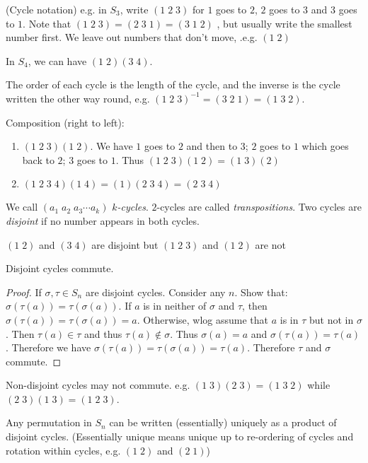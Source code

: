 \documentclass[a4pape]{article}
\begin{document}
\begin{notation}
  (Cycle notation) e.g. in $S_3$, write $(1\;2\;3)$ for $1$ goes to $2$, $2$ goes to $3$ and $3$ goes to $1$. Note that $(1\; 2\; 3) = (2\; 3\; 1) = (3\; 1\; 2)$ , but usually write the smallest number first. We leave out numbers that don't move, .e.g. $(1\; 2)$

  In $S_4$, we can have $(1\; 2)(3\; 4)$.
\end{notation}
\note The order of each cycle is the length of the cycle, and the inverse is the cycle written the other way round, e.g. $(1\; 2\; 3)^{-1} = (3\; 2\; 1) = (1\; 3\; 2)$.

\begin{eg}
  Composition (right to left):
  \begin{enumerate}
  \item $(1\; 2\; 3)(1\; 2)$. We have $1$ goes to $2$ and then to $3$; $2$ goes to $1$ which goes back to $2$; $3$ goes to $1$. Thus $(1\; 2\; 3)(1\; 2) = (1\;3)(2)$
  \item $(1\; 2\; 3\; 4)(1\; 4) = (1)(2\; 3\; 4) = (2\; 3\; 4)$
\end{enumerate}
\end{eg}
\begin{defi}
  We call $(a_1\; a_2\; a_3\cdots a_k)$ \emph{$k$-cycles}. $2$-cycles are called \emph{transpositions}. Two cycles are \emph{disjoint} if no number appears in both cycles.
\end{defi}
\begin{eg}
  $(1\; 2)$ and $(3\; 4)$ are disjoint but $(1\; 2\; 3)$ and $(1\; 2)$ are not
\end{eg}
\begin{lemma}
  Disjoint cycles commute.
\end{lemma}
\begin{proof}
  If $\sigma, \tau\in S_n$ are disjoint cycles. Consider any $n$. Show that: $\sigma(\tau(a)) = \tau(\sigma(a))$. If $a$ is in neither of $\sigma$ and $\tau$, then $\sigma(\tau(a)) = \tau(\sigma(a)) = a$. Otherwise, wlog assume that $a$ is in $\tau$ but not in $\sigma$. Then $\tau(a)\in \tau$ and thus $\tau(a)\not\in \sigma$. Thus $\sigma(a) = a$ and $\sigma(\tau(a)) = \tau(a)$. Therefore we have $\sigma(\tau(a)) = \tau(\sigma(a)) = \tau(a)$. Therefore $\tau$ and $\sigma$ commute.
\end{proof}
\note Non-disjoint cycles may not commute. e.g. $(1\; 3)(2\; 3) = (1\; 3\; 2)$ while $(2\; 3)(1\; 3) = (1\; 2\; 3)$.

\begin{thm}
  Any permutation in $S_n$ can be written (essentially) uniquely as a product of disjoint cycles. (Essentially unique means unique up to re-ordering of cycles and rotation within cycles, e.g. $(1\; 2)$ and $(2\; 1)$)
\end{thm}
\end{document}

